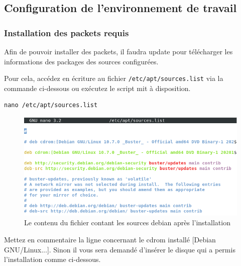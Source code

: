 \documentclass[12pt,a4paper]{article}
\newcommand{\code}[1]{\colorbox{light-gray}{\texttt{#1}}}
\begin{document}
\begin{flushleft}
       \subsection{Configuration de l'environnement de travail}
       
      
        \subsubsection{Installation des packets requis}
       \item Afin de pouvoir installer des packets, il faudra update pour télécharger les informations des packages des sources configurées. 
       \item Pour cela, accédez en écriture au fichier \code{/etc/apt/sources.list} via la commande ci-dessous ou exécutez le script mit à disposition.

       \begin{lstlisting}
nano /etc/apt/sources.list
       \end{lstlisting}      

       \begin{figure}[!h]
         \centering
               \includegraphics[scale=0.6]{sources.list}
            \caption{Le contenu du fichier contant les sources debian après l'installation}
        \end{figure}
        
       \item Mettez en commentaire la ligne concernant le cdrom installé [Debian GNU/Linux...]. Sinon il vous sera demandé d'insérer le disque qui a permis l'installation comme ci-dessous.             


\end{flushleft}
\end{document}
